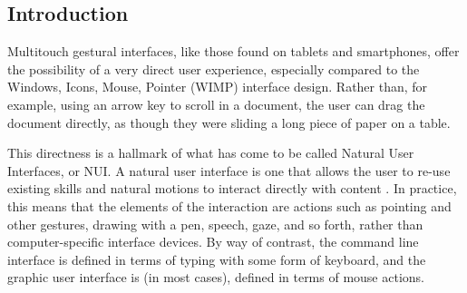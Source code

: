 %
%

\subsection{Introduction} \label{section:Introduction}

Multitouch gestural interfaces, like those found on tablets and smartphones, offer the possibility of a very direct user experience, especially compared to the Windows, Icons, Mouse, Pointer (WIMP) interface design. 
Rather than, for example, using an arrow key to scroll in a document, the user can drag the document directly, as though they were sliding a long piece of paper on a table. 

This directness is a hallmark of what has come to be called Natural User Interfaces, or NUI. 
A natural user interface is one that allows the user to re-use existing skills and natural motions to interact directly with content \citep{blakeNUIWin}. 
In practice, this means that the elements of the interaction are actions such as pointing and other gestures, drawing with a pen, speech, gaze, and so forth, rather than computer-specific interface devices. 
By way of contrast, the command line interface is defined in terms of typing with some form of keyboard, and the graphic user interface is (in most cases), defined in terms of mouse actions. 

